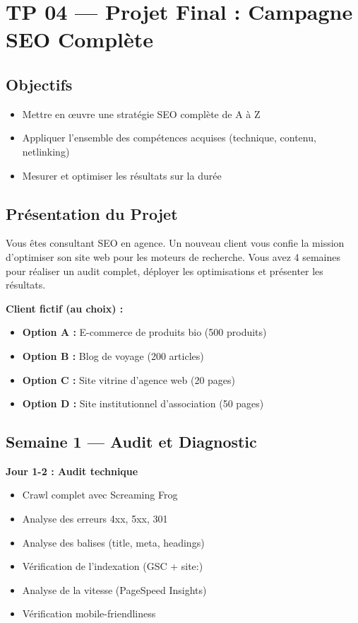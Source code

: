\documentclass[12pt,a4paper]{report}
\begin{document}
\chapter{TP 04 --- Projet Final : Campagne SEO Complète}

\section{Objectifs}
\begin{itemize}
\item Mettre en œuvre une stratégie SEO complète de A à Z
\item Appliquer l'ensemble des compétences acquises (technique, contenu, netlinking)
\item Mesurer et optimiser les résultats sur la durée
\end{itemize}

\section{Présentation du Projet}

Vous êtes consultant SEO en agence. Un nouveau client vous confie la mission d'optimiser son site web pour les moteurs de recherche. Vous avez 4 semaines pour réaliser un audit complet, déployer les optimisations et présenter les résultats.

\textbf{Client fictif (au choix) :}
\begin{itemize}
\item \textbf{Option A :} E-commerce de produits bio (500 produits)
\item \textbf{Option B :} Blog de voyage (200 articles)
\item \textbf{Option C :} Site vitrine d'agence web (20 pages)
\item \textbf{Option D :} Site institutionnel d'association (50 pages)
\end{itemize}

\section{Semaine 1 --- Audit et Diagnostic}

\textbf{Jour 1-2 : Audit technique}
\begin{itemize}
\item[$\square$] Crawl complet avec Screaming Frog
\item[$\square$] Analyse des erreurs 4xx, 5xx, 301
\item[$\square$] Analyse des balises (title, meta, headings)
\item[$\square$] Vérification de l'indexation (GSC + site:)
\item[$\square$] Analyse de la vitesse (PageSpeed Insights)
\item[$\square$] Vérification mobile-friendliness
\end{itemize}
\end{document}
